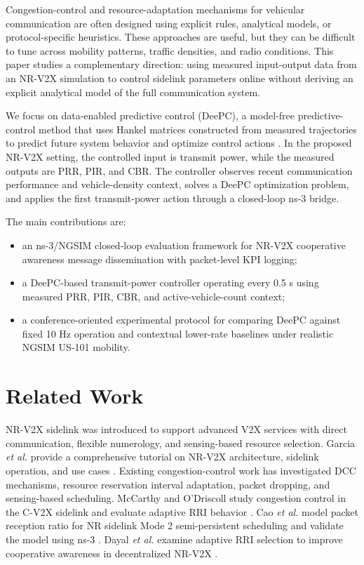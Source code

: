 \documentclass[conference]{IEEEtran}
\begin{document}
Congestion-control and resource-adaptation mechanisms for vehicular communication are often designed using explicit rules, analytical models, or protocol-specific heuristics. These approaches are useful, but they can be difficult to tune across mobility patterns, traffic densities, and radio conditions. This paper studies a complementary direction: using measured input-output data from an NR-V2X simulation to control sidelink parameters online without deriving an explicit analytical model of the full communication system.

We focus on data-enabled predictive control (DeePC), a model-free predictive-control method that uses Hankel matrices constructed from measured trajectories to predict future system behavior and optimize control actions \cite{coulson2019deepc}. In the proposed NR-V2X setting, the controlled input is transmit power, while the measured outputs are PRR, PIR, and CBR. The controller observes recent communication performance and vehicle-density context, solves a DeePC optimization problem, and applies the first transmit-power action through a closed-loop ns-3 bridge.

The main contributions are:
\begin{itemize}
    \item an ns-3/NGSIM closed-loop evaluation framework for NR-V2X cooperative awareness message dissemination with packet-level KPI logging;
    \item a DeePC-based transmit-power controller operating every 0.5 s using measured PRR, PIR, CBR, and active-vehicle-count context;
    \item a conference-oriented experimental protocol for comparing DeePC against fixed 10 Hz operation and contextual lower-rate baselines under realistic NGSIM US-101 mobility.
\end{itemize}

\section{Related Work}

NR-V2X sidelink was introduced to support advanced V2X services with direct communication, flexible numerology, and sensing-based resource selection. Garcia \emph{et al.} provide a comprehensive tutorial on NR-V2X architecture, sidelink operation, and use cases \cite{garcia2021tutorial}. Existing congestion-control work has investigated DCC mechanisms, resource reservation interval adaptation, packet dropping, and sensing-based scheduling. McCarthy and O'Driscoll study congestion control in the C-V2X sidelink and evaluate adaptive RRI behavior \cite{mccarthy2021congestion}. Cao \emph{et al.} model packet reception ratio for NR sidelink Mode 2 semi-persistent scheduling and validate the model using ns-3 \cite{cao2023sps}. Dayal \emph{et al.} examine adaptive RRI selection to improve cooperative awareness in decentralized NR-V2X \cite{dayal2023adaptive}.
\end{document}

